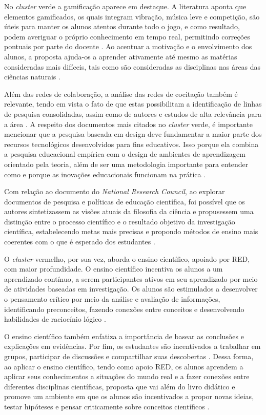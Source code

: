 \documentclass[portuguese]{textolivre}
\begin{document}
No \textit{cluster} verde a gamificação aparece em destaque. A literatura aponta que elementos gamificados, os quais integram vibração, música leve e competição, são úteis para manter os alunos atentos durante todo o jogo, e como resultado, podem averiguar o próprio conhecimento em tempo real, permitindo correções pontuais por parte do docente \cite{lin_kahoot!_2018}. Ao acentuar a motivação e o envolvimento dos alunos, a proposta ajuda-os a aprender ativamente até mesmo as matérias consideradas mais difíceis, tais como são consideradas as disciplinas nas áreas das ciências naturais \cite{jones_kahoot!_2019}.

Além das redes de colaboração, a análise das redes de cocitação também é relevante, tendo em vista o fato de que estas possibilitam a identificação de linhas de pesquisa consolidadas, assim como de autores e estudos de alta relevância para a área \cite{castanha_estudos_2020}. A respeito dos documentos mais citados no \textit{cluster} verde, é importante mencionar que a pesquisa baseada em design deve fundamentar a maior parte dos recursos tecnológicos desenvolvidos para fins educativos. Isso porque ela combina a pesquisa educacional empírica com o design de ambientes de aprendizagem orientado pela teoria, além de ser uma metodologia importante para entender como e porque as inovações educacionais funcionam na prática \cite{kennedy-clark_reflection:_2015}.

Com relação ao documento do \textit{National Research Council}, ao explorar documentos de pesquisa e políticas de educação científica, foi possível que os autores sintetizassem as visões atuais da filosofia da ciência e propusessem uma distinção entre o processo científico e o resultado objetivo da investigação científica, estabelecendo metas mais precisas e propondo métodos de ensino mais coerentes com o que é esperado dos estudantes \cite{keller_framework_2012}.

O \textit{cluster} vermelho, por sua vez, aborda o ensino científico, apoiado por RED, com maior profundidade. O ensino científico incentiva os alunos a um aprendizado contínuo, a serem participantes ativos em seu aprendizado por meio de atividades baseadas em investigação. Os alunos são estimulados a desenvolver o pensamento crítico por meio da análise e avaliação de informações, identificando preconceitos, fazendo conexões entre conceitos e desenvolvendo habilidades de raciocínio lógico \cite{american_association_for_the_advancement_of_science_vision_2011}.

O ensino científico também enfatiza a importância de basear as conclusões e explicações em evidências. Por fim, os estudantes são incentivados a trabalhar em grupos, participar de discussões e compartilhar suas descobertas \cite{couch_scientific_2015}. Dessa forma, ao aplicar o ensino científico, tendo como apoio RED, os alunos aprendem a aplicar seus conhecimentos a situações do mundo real e a fazer conexões entre diferentes disciplinas científicas, proposta que vai além do livro didático e promove um ambiente em que os alunos são incentivados a propor novas ideias, testar hipóteses e pensar criticamente sobre conceitos científicos \cite{couch_scientific_2015}.
\end{document}
